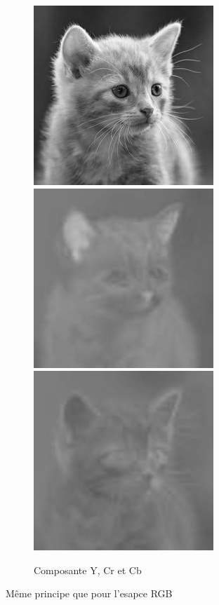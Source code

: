 \documentclass{article}
\begin{document}
\begin{figure}[h]
\centerline{\includegraphics[scale=0.7]{./rendus/Y.png} \includegraphics[scale=0.7]{./rendus/Cr.png} \includegraphics[scale=0.7]{./rendus/Cb.png}}
\caption{Composante Y, Cr et Cb }
\end{figure}

Même principe que pour l'esapce RGB
\end{document}
